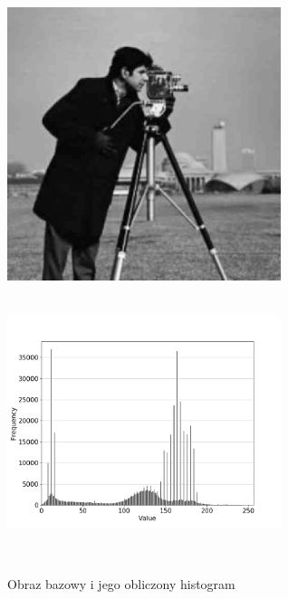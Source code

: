 \documentclass[a4paper,12pt]{book}
\begin{document}
\begin{figure}[H]
	\label{fig:man-histogram}
	\caption{Obraz bazowy i jego obliczony histogram}
	\includegraphics[width=8cm, height=8cm]{man-unmodified.jpg}
	\includegraphics[width=8cm, height=8cm]{5-1/calculate-photoman.png}
\end{figure}
\end{document}
